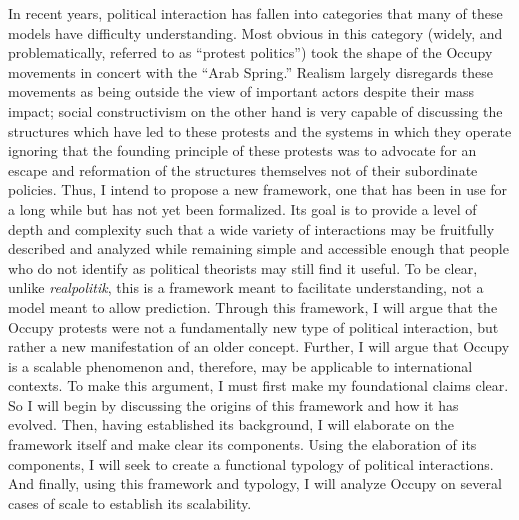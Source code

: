 \documentclass[letterpaper,12pt]{article}
\begin{document}
In recent years, political interaction has fallen into categories that many of these models have difficulty understanding. 
Most obvious in this category (widely, and problematically, referred to as ``protest politics'') took the shape of the Occupy movements in concert with the ``Arab Spring.'' 
Realism largely disregards these movements as being outside the view of important actors despite their mass impact; social constructivism on the other hand is very capable of discussing the structures which have led to these protests and the systems in which they operate ignoring that the founding principle of these protests was to advocate for an escape and reformation of the structures themselves not of their subordinate policies. 
Thus, I intend to propose a new framework, one that has been in use for a long while but has not yet been formalized. 
Its goal is to provide a level of depth and complexity such that a wide variety of interactions may be fruitfully described and analyzed while remaining simple and accessible enough that people who do not identify as political theorists may still find it useful. 
To be clear, unlike \textit{realpolitik}, this is a framework meant to facilitate understanding, not a model meant to allow prediction. 
Through this framework, I will argue that the Occupy protests were not a fundamentally new type of political interaction, but rather a new manifestation of an older concept. 
Further, I will argue that Occupy is a scalable phenomenon and, therefore, may be applicable to international contexts. 
To make this argument, I must first make my foundational claims clear. 
So I will begin by discussing the origins of this framework and how it has evolved. 
Then, having established its background, I will elaborate on the framework itself and make clear its components. 
Using the elaboration of its components, I will seek to create a functional typology of political interactions. 
And finally, using this framework and typology, I will analyze Occupy on several cases of scale to establish its scalability.
\end{document}
